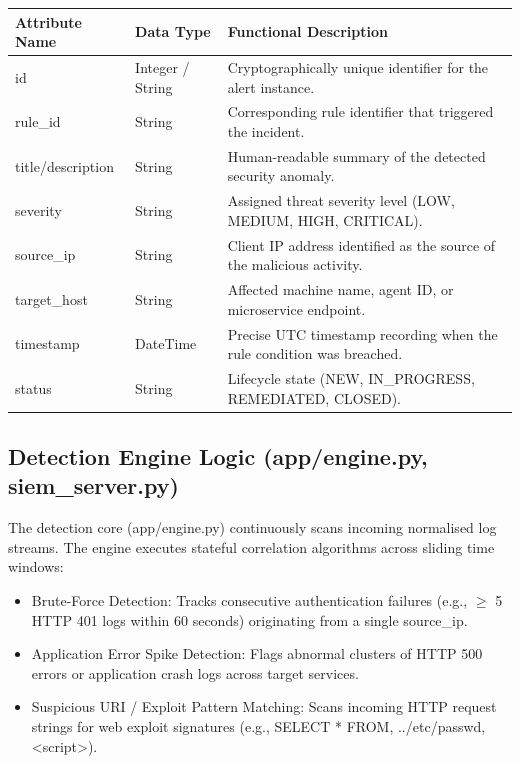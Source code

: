 \begin{table}[htbp]
\centering
\begin{tabular}{|P{3cm}|P{3cm}|P{5cm}|}
\hline
Attribute Name & Data Type & Functional Description \\ \hline
id & Integer / String & Cryptographically unique identifier for the alert instance. \\ \hline
rule\_id & String & Corresponding rule identifier that triggered the incident. \\ \hline
title/description & String & Human-readable summary of the detected security anomaly. \\ \hline
severity & String & Assigned threat severity level (LOW, MEDIUM, HIGH, CRITICAL). \\ \hline
source\_ip & String & Client IP address identified as the source of the malicious activity. \\ \hline
target\_host & String & Affected machine name, agent ID, or microservice endpoint. \\ \hline
timestamp & DateTime & Precise UTC timestamp recording when the rule condition was breached. \\ \hline
status & String & Lifecycle state (NEW, IN\_PROGRESS, REMEDIATED, CLOSED). \\ \hline
\end{tabular}
\end{table}

\subsection{Detection Engine Logic (app/engine.py, siem\_server.py)}

The detection core (app/engine.py) continuously scans incoming normalised log streams. The engine executes stateful correlation algorithms across sliding time windows:

\begin{itemize}
  \item Brute-Force Detection: Tracks consecutive authentication failures (e.g., $\ge$ 5 HTTP 401 logs within 60 seconds) originating from a single source\_ip.
  \item Application Error Spike Detection: Flags abnormal clusters of HTTP 500 errors or application crash logs across target services.
  \item Suspicious URI / Exploit Pattern Matching: Scans incoming HTTP request strings for web exploit signatures (e.g., SELECT * FROM, ../etc/passwd, <script>).
\end{itemize}

